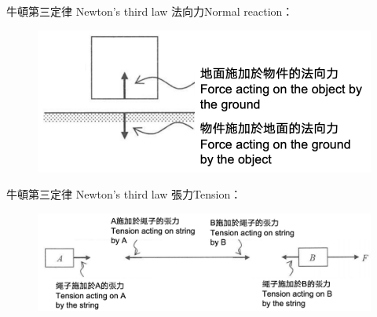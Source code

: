 \documentclass[beamer=true]{standalone}
\begin{document}
\begin{frame}{牛頓第三定律 Newton's third law}
    法向力Normal reaction：
    \begin{figure}[h!]
        \centering
        \includegraphics[width=.8\textwidth]{assets/69c3d3bd.png}
    \end{figure}
\end{frame}
\begin{frame}{牛頓第三定律 Newton's third law}
    張力Tension：
    \begin{figure}[h!]
        \centering
        \includegraphics[width=.8\textwidth]{assets/f559bb67.png}
    \end{figure}
\end{frame}
\end{document}
